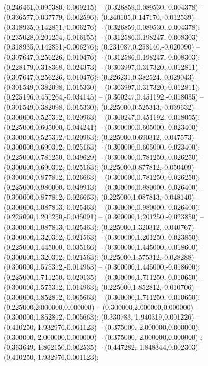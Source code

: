 (0.246461,0.095380,-0.009215) -- (0.326859,0.089530,-0.004378) -- (0.336577,0.037779,-0.002596);
 (0.240105,0.147170,-0.012539) -- (0.318935,0.142851,-0.006276) -- (0.326859,0.089530,-0.004378);
 (0.235028,0.201254,-0.016155) -- (0.312586,0.198247,-0.008303) -- (0.318935,0.142851,-0.006276);
 (0.231087,0.258140,-0.020090) -- (0.307647,0.256226,-0.010476) -- (0.312586,0.198247,-0.008303);
 (0.228179,0.318368,-0.024373) -- (0.303997,0.317320,-0.012811) -- (0.307647,0.256226,-0.010476);
 (0.226231,0.382524,-0.029043) -- (0.301549,0.382098,-0.015330) -- (0.303997,0.317320,-0.012811);
 (0.225196,0.451264,-0.034145) -- (0.300247,0.451192,-0.018055) -- (0.301549,0.382098,-0.015330);
 (0.225000,0.525313,-0.039632) -- (0.300000,0.525312,-0.020963) -- (0.300247,0.451192,-0.018055);
 (0.225000,0.605000,-0.044241) -- (0.300000,0.605000,-0.023400) -- (0.300000,0.525312,-0.020963);
 (0.225000,0.690312,-0.047573) -- (0.300000,0.690312,-0.025163) -- (0.300000,0.605000,-0.023400);
 (0.225000,0.781250,-0.049629) -- (0.300000,0.781250,-0.026250) -- (0.300000,0.690312,-0.025163);
 (0.225000,0.877812,-0.050409) -- (0.300000,0.877812,-0.026663) -- (0.300000,0.781250,-0.026250);
 (0.225000,0.980000,-0.049913) -- (0.300000,0.980000,-0.026400) -- (0.300000,0.877812,-0.026663);
 (0.225000,1.087813,-0.048140) -- (0.300000,1.087813,-0.025463) -- (0.300000,0.980000,-0.026400);
 (0.225000,1.201250,-0.045091) -- (0.300000,1.201250,-0.023850) -- (0.300000,1.087813,-0.025463);
 (0.225000,1.320312,-0.040767) -- (0.300000,1.320312,-0.021563) -- (0.300000,1.201250,-0.023850);
 (0.225000,1.445000,-0.035166) -- (0.300000,1.445000,-0.018600) -- (0.300000,1.320312,-0.021563);
 (0.225000,1.575312,-0.028288) -- (0.300000,1.575312,-0.014963) -- (0.300000,1.445000,-0.018600);
 (0.225000,1.711250,-0.020135) -- (0.300000,1.711250,-0.010650) -- (0.300000,1.575312,-0.014963);
 (0.225000,1.852812,-0.010706) -- (0.300000,1.852812,-0.005663) -- (0.300000,1.711250,-0.010650);
 (0.225000,2.000000,0.000000) -- (0.300000,2.000000,0.000000) -- (0.300000,1.852812,-0.005663);
 (0.330783,-1.940319,0.001226) -- (0.410250,-1.932976,0.001123) -- (0.375000,-2.000000,0.000000);
 (0.300000,-2.000000,0.000000) -- (0.375000,-2.000000,0.000000) ;
 (0.363649,-1.862150,0.002535) -- (0.447282,-1.848344,0.002303) -- (0.410250,-1.932976,0.001123);
